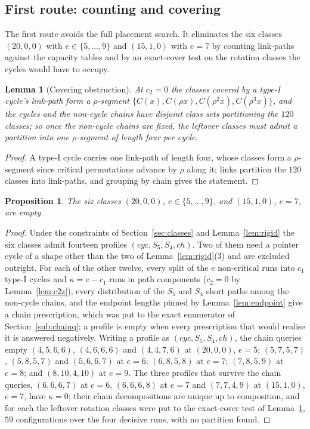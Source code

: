 \documentclass[10pt]{article}
\newtheorem{lemma}[theorem]{Lemma}
\newtheorem{proposition}[theorem]{Proposition}
\theoremstyle{remark}
\theoremstyle{plain}
\newcommand{\NCh}{\mathit{ch}}
\newcommand{\Ncyc}{\mathit{cyc}}
\begin{document}
\subsection{First route: counting and covering}

The first route avoids the full placement search.  It eliminates the
six classes $(20,0,0)$ with $e\in\{5,\dots,9\}$ and $(15,1,0)$ with
$e=7$ by counting link-paths against the capacity tables and by an
exact-cover test on the rotation classes the cycles would have to
occupy.

\begin{lemma}[Covering obstruction]\label{lem:cover}
At $c_2=0$ the classes covered by a type-I cycle's link-path form a
$\rho$-segment $\{C(x),C(\rho x),C(\rho^{2}x),C(\rho^{3}x)\}$, and the
cycles and the non-cycle chains have disjoint class sets partitioning
the $120$ classes; so once the non-cycle chains are fixed, the leftover
classes must admit a partition into one $\rho$-segment of length four
per cycle.
\end{lemma}

\begin{proof}
A type-I cycle carries one link-path of length four, whose classes
form a $\rho$-segment since critical permutations advance by $\rho$
along it; links partition the $120$ classes into link-paths, and
grouping by chain gives the statement.
\end{proof}

\begin{proposition}\label{prop:sixempty}
The six classes $(20,0,0)$, $e\in\{5,\dots,9\}$, and $(15,1,0)$, $e=7$,
are empty.
\end{proposition}

\begin{proof}
Under the constraints of Section~\ref{sec:classes} and
Lemma~\ref{lem:rigid} the six classes admit fourteen profiles
$(\Ncyc,S_5,S_4,\NCh)$.  Two of them need a pointer cycle of a shape
other than the two of Lemma~\ref{lem:rigid}(3) and are excluded
outright.  For each of the other twelve, every split of the $e$ non-critical
runs into $c_1$ type-I cycles and $\kappa=e-c_1$ runs in path
components ($c_2=0$ by Lemma~\ref{lem:c2z}), every distribution of the
$S_5$ and $S_4$ short paths among the non-cycle chains, and the
endpoint lengths pinned by Lemma~\ref{lem:endpoint} give a chain
prescription, which was put to the exact enumerator of
Section~\ref{sub:chainq}; a profile is empty when every prescription
that would realise it is answered negatively.  Writing a profile as
$(\Ncyc,S_5,S_4,\NCh)$, the chain queries empty $(4,5,6,6)$,
$(4,6,6,6)$ and $(4,4,7,6)$ at $(20,0,0)$, $e=5$; $(5,7,5,7)$,
$(5,8,5,7)$ and $(5,6,6,7)$ at $e=6$; $(6,8,5,8)$ at $e=7$;
$(7,8,5,9)$ at $e=8$; and $(8,10,4,10)$ at $e=9$.
The three profiles that survive the chain queries, $(6,6,6,7)$ at
$e=6$, $(6,6,6,8)$ at $e=7$ and $(7,7,4,9)$ at $(15,1,0)$, $e=7$, have
$\kappa=0$; their chain decompositions are unique up to composition,
and for each
the leftover rotation classes were put to the exact-cover test of
Lemma~\ref{lem:cover}, $59$ configurations over the four decisive
runs, with no partition found.
\end{proof}
\end{document}
